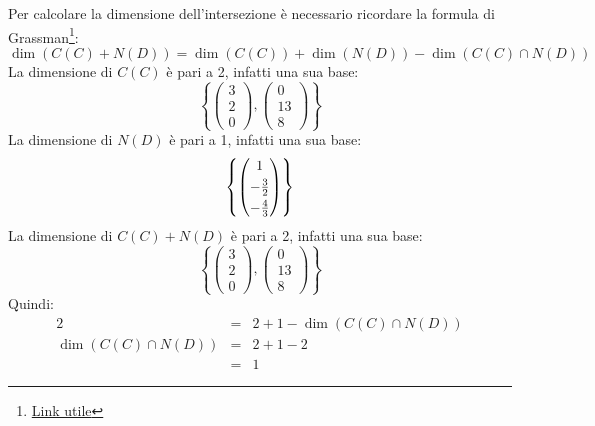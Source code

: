 \documentclass[a4paper]{article}
\makeatletter
\newenvironment{rowequmat}[1]{\left(\array{@{}#1@{}}}{\endarray\right)}
\makeatother
\begin{document}
	\noindent
	Per calcolare la dimensione dell'intersezione è necessario ricordare la formula di Grassman\footnote{\href{https://www.youmath.it/domande-a-risposte/view/1090-chiarimenti-sul-teorema-di-grassman.html}{Link utile}}:
	\begin{equation*}
		\dim\left(C(C) + N(D)\right) = \dim\left(C(C)\right) + \dim\left(N(D)\right) - \dim\left(C(C) \cap N(D)\right)
	\end{equation*}
	La dimensione di $C(C)$ è pari a 2, infatti una sua base:
	\begin{equation*}
		\left\{\begin{pmatrix}
			3 \\ 2 \\ 0
		\end{pmatrix}, \begin{pmatrix}
			0 \\ 13 \\ 8 
		\end{pmatrix}\right\}
	\end{equation*}
	La dimensione di $N(D)$ è pari a 1, infatti una sua base:
	\begin{equation*}
		\left\{\begin{rowequmat}{c}
			1 \\ [.3em]
			-\frac{3}{2} \\ [.3em]
			-\frac{4}{3}
		\end{rowequmat}\right\}
	\end{equation*}
	La dimensione di $C(C) + N(D)$ è pari a 2, infatti una sua base:
	\begin{equation*}
		\left\{\begin{pmatrix}
			3 \\ 2 \\ 0
		\end{pmatrix}, \begin{pmatrix}
			0 \\ 13 \\ 8 
		\end{pmatrix}\right\}
	\end{equation*}
	Quindi:
	\begin{equation*}
		\begin{array}{rcl}
			2 &=& 2 + 1 - \dim\left(C(C) \cap N(D)\right) \\
			\dim\left(C(C) \cap N(D)\right) &=& 2 + 1 -2 \\
			&=& 1
		\end{array}
	\end{equation*}\newpage
	
\end{document}
